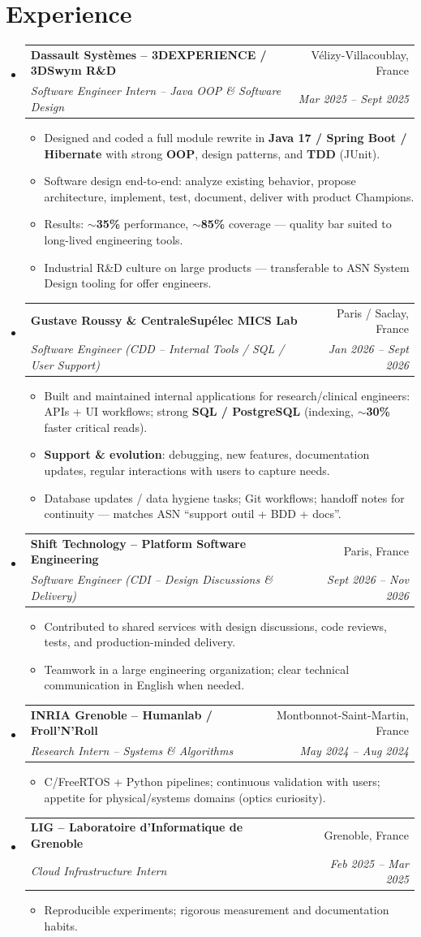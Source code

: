 \documentclass[letterpaper,10.5pt]{article}
\makeatletter
\newcommand{\resumeItem}[1]{\item\small{#1 \vspace{-1.5pt}}}
\newcommand{\resumeSubheading}[4]{\vspace{-1pt}\item\begin{tabular*}{0.97\textwidth}[t]{l@{\extracolsep{\fill}}r}\textbf{#1} & #2 \\\textit{\small#3} & \textit{\small #4} \\\end{tabular*}\vspace{-5pt}}
\newcommand{\resumeSubHeadingListStart}{\begin{itemize}[leftmargin=0.15in, label={}]}
\newcommand{\resumeSubHeadingListEnd}{\end{itemize}}
\newcommand{\resumeItemListStart}{\begin{itemize}[leftmargin=0.18in]}
\newcommand{\resumeItemListEnd}{\end{itemize}\vspace{-3pt}}
\makeatother
\begin{document}
\section{Experience}
\resumeSubHeadingListStart
  \resumeSubheading
    {Dassault Syst\`emes -- 3DEXPERIENCE / 3DSwym R\&D}{V\'elizy-Villacoublay, France}
    {Software Engineer Intern -- Java OOP \& Software Design}{Mar 2025 -- Sept 2025}
    \resumeItemListStart
      \resumeItem{Designed and coded a full module rewrite in \textbf{Java 17 / Spring Boot / Hibernate} with strong \textbf{OOP}, design patterns, and \textbf{TDD} (JUnit).}
      \resumeItem{Software design end-to-end: analyze existing behavior, propose architecture, implement, test, document, deliver with product Champions.}
      \resumeItem{Results: \textbf{$\sim$35\%} performance, \textbf{$\sim$85\%} coverage --- quality bar suited to long-lived engineering tools.}
      \resumeItem{Industrial R\&D culture on large products --- transferable to ASN System Design tooling for offer engineers.}
    \resumeItemListEnd
  \resumeSubheading
    {Gustave Roussy \& CentraleSup\'elec MICS Lab}{Paris / Saclay, France}
    {Software Engineer (CDD -- Internal Tools / SQL / User Support)}{Jan 2026 -- Sept 2026}
    \resumeItemListStart
      \resumeItem{Built and maintained internal applications for research/clinical engineers: APIs + UI workflows; strong \textbf{SQL / PostgreSQL} (indexing, \textbf{$\sim$30\%} faster critical reads).}
      \resumeItem{\textbf{Support \& evolution}: debugging, new features, documentation updates, regular interactions with users to capture needs.}
      \resumeItem{Database updates / data hygiene tasks; Git workflows; handoff notes for continuity --- matches ASN ``support outil + BDD + docs''.}
    \resumeItemListEnd
  \resumeSubheading
    {Shift Technology -- Platform Software Engineering}{Paris, France}
    {Software Engineer (CDI -- Design Discussions \& Delivery)}{Sept 2026 -- Nov 2026}
    \resumeItemListStart
      \resumeItem{Contributed to shared services with design discussions, code reviews, tests, and production-minded delivery.}
      \resumeItem{Teamwork in a large engineering organization; clear technical communication in English when needed.}
    \resumeItemListEnd
  \resumeSubheading
    {INRIA Grenoble -- Humanlab / Froll'N'Roll}{Montbonnot-Saint-Martin, France}
    {Research Intern -- Systems \& Algorithms}{May 2024 -- Aug 2024}
    \resumeItemListStart
      \resumeItem{C/FreeRTOS + Python pipelines; continuous validation with users; appetite for physical/systems domains (optics curiosity).}
    \resumeItemListEnd
  \resumeSubheading
    {LIG -- Laboratoire d'Informatique de Grenoble}{Grenoble, France}
    {Cloud Infrastructure Intern}{Feb 2025 -- Mar 2025}
    \resumeItemListStart
      \resumeItem{Reproducible experiments; rigorous measurement and documentation habits.}
    \resumeItemListEnd
\resumeSubHeadingListEnd
\end{document}
